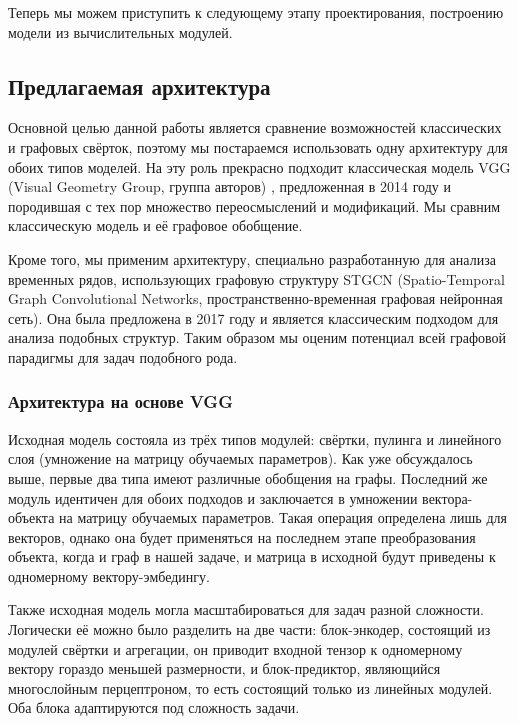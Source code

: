 \documentclass[12pt]{article}
\begin{document}
Теперь мы можем приступить к следующему этапу проектирования, построению модели из вычислительных модулей.

\subsection{Предлагаемая архитектура}

Основной целью данной работы является сравнение возможностей классических и графовых свёрток, поэтому мы постараемся использовать одну архитектуру для обоих типов моделей. На эту роль прекрасно подходит классическая модель VGG (Visual Geometry Group, группа авторов) \cite{simonyan2014very}, предложенная в 2014 году и породившая с тех пор множество переосмыслений и модификаций. Мы сравним классическую модель и её графовое обобщение.

Кроме того, мы применим архитектуру, специально разработанную для анализа временных рядов, использующих графовую структуру STGCN (Spatio-Temporal Graph Convolutional Networks, пространственно-временная графовая нейронная сеть). Она была предложена в 2017 году \cite{yu2017spatio} и является классическим подходом для анализа подобных структур. Таким образом мы оценим потенциал всей графовой парадигмы для задач подобного рода.

\subsubsection{Архитектура на основе VGG}
\label{vgg}

Исходная модель состояла из трёх типов модулей: свёртки, пулинга и линейного слоя (умножение на матрицу обучаемых параметров). Как уже обсуждалось выше, первые два типа имеют различные обобщения на графы. Последний же модуль идентичен для обоих подходов и заключается в умножении вектора-объекта на матрицу обучаемых параметров. Такая операция определена лишь для векторов, однако она будет применяться на последнем этапе преобразования объекта, когда и граф в нашей задаче, и матрица в исходной будут приведены к одномерному вектору-эмбедингу.

Также исходная модель могла масштабироваться для задач разной сложности. Логически её можно было разделить на две части: блок-энкодер, состоящий из модулей свёртки и агрегации, он приводит входной тензор к одномерному вектору гораздо меньшей размерности, и блок-предиктор, являющийся многослойным перцептроном, то есть состоящий только из линейных модулей. Оба блока адаптируются под сложность задачи. 
\end{document}
